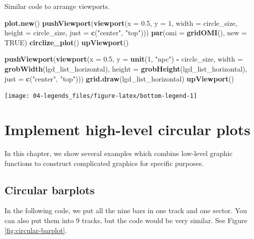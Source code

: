 \documentclass[]{book}
\newenvironment{Shaded}{\begin{snugshade}}{\end{snugshade}}
\newcommand{\KeywordTok}[1]{\textcolor[rgb]{0.13,0.29,0.53}{\textbf{#1}}}
\newcommand{\DataTypeTok}[1]{\textcolor[rgb]{0.13,0.29,0.53}{#1}}
\newcommand{\DecValTok}[1]{\textcolor[rgb]{0.00,0.00,0.81}{#1}}
\newcommand{\FloatTok}[1]{\textcolor[rgb]{0.00,0.00,0.81}{#1}}
\newcommand{\StringTok}[1]{\textcolor[rgb]{0.31,0.60,0.02}{#1}}
\newcommand{\OtherTok}[1]{\textcolor[rgb]{0.56,0.35,0.01}{#1}}
\newcommand{\OperatorTok}[1]{\textcolor[rgb]{0.81,0.36,0.00}{\textbf{#1}}}
\newcommand{\NormalTok}[1]{#1}
\theoremstyle{definition}
\theoremstyle{definition}
\theoremstyle{remark}
\begin{document}
Similar code to arrange viewports.

\begin{Shaded}
\begin{Highlighting}[]
\KeywordTok{plot.new}\NormalTok{()}
\KeywordTok{pushViewport}\NormalTok{(}\KeywordTok{viewport}\NormalTok{(}\DataTypeTok{x =} \FloatTok{0.5}\NormalTok{, }\DataTypeTok{y =} \DecValTok{1}\NormalTok{, }\DataTypeTok{width =}\NormalTok{ circle_size, }\DataTypeTok{height =}\NormalTok{ circle_size,}
    \DataTypeTok{just =} \KeywordTok{c}\NormalTok{(}\StringTok{"center"}\NormalTok{, }\StringTok{"top"}\NormalTok{)))}
\KeywordTok{par}\NormalTok{(}\DataTypeTok{omi =} \KeywordTok{gridOMI}\NormalTok{(), }\DataTypeTok{new =} \OtherTok{TRUE}\NormalTok{)}
\KeywordTok{circlize_plot}\NormalTok{()}
\KeywordTok{upViewport}\NormalTok{()}

\KeywordTok{pushViewport}\NormalTok{(}\KeywordTok{viewport}\NormalTok{(}\DataTypeTok{x =} \FloatTok{0.5}\NormalTok{, }\DataTypeTok{y =} \KeywordTok{unit}\NormalTok{(}\DecValTok{1}\NormalTok{, }\StringTok{"npc"}\NormalTok{) }\OperatorTok{-}\StringTok{ }\NormalTok{circle_size, }
    \DataTypeTok{width =} \KeywordTok{grobWidth}\NormalTok{(lgd_list_horizontal), }\DataTypeTok{height =} \KeywordTok{grobHeight}\NormalTok{(lgd_list_horizontal), }
    \DataTypeTok{just =} \KeywordTok{c}\NormalTok{(}\StringTok{"center"}\NormalTok{, }\StringTok{"top"}\NormalTok{)))}
\KeywordTok{grid.draw}\NormalTok{(lgd_list_horizontal)}
\KeywordTok{upViewport}\NormalTok{()}
\end{Highlighting}
\end{Shaded}

\begin{center}\texttt{[image: 04-legends\_files/figure-latex/bottom-legend-1]} \end{center}

\chapter{Implement high-level circular plots}\label{high-level-plots}

In this chapter, we show several examples which combine low-level
graphic functions to construct complicated graphics for specific
purposes.

\section{Circular barplots}\label{circular-barplot}

In the following code, we put all the nine bars in one track and one
sector. You can also put them into 9 tracks, but the code would be very
similar. See Figure \ref{fig:circular-barplot}.
\end{document}
